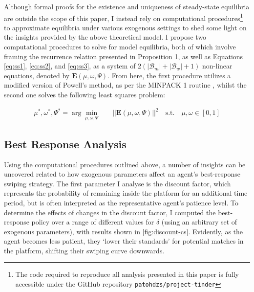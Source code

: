 Although formal proofs for the existence and uniqueness of steady-state equilibria are outside the scope of this paper, I instead rely on computational procedures\footnote{The code required to reproduce all analysis presented in this paper is fully accessible under the GitHub repository \texttt{patohdzs/project-tinder}} to approximate equilibria under various exogenous settings to shed some light on the insights provided by the above theoretical model. I propose two computational procedures to solve for model equilibria, both of which involve framing the recurrence relation presented in Proposition 1, as well as Equations \ref{eq:ss1}, \ref{eq:ss2}, and \ref{eq:ss3}, as a system of $2(|\mathcal{B}_m|+|\mathcal{B}_w|+1)$ non-linear equations, denoted by $\mathbf{E}(\mu,\omega,\Psi)$. From here, the first procedure utilizes a modified version of Powell's method, as per the MINPACK 1 routine \citep{more1980user}, whilst the second one solves the following least squares problem:

\begin{equation*}
    \begin{split} 
        \mu^*, \omega^*, \Psi^* = \arg\min_{\mu,\omega,\Psi} \quad &  ||\mathbf{E}(\mu,\omega,\Psi)||^2 \quad \textrm{s.t.} \quad  \mu, \omega  \in [0,1] 
    \end{split}
\end{equation*}


\subsection{Best Response Analysis}\label{sec:section3.2} 
Using the computational procedures outlined above, a number of insights can be uncovered related to how exogenous parameters affect an agent's best-response swiping strategy. The first parameter I analyse is the discount factor, which represents the probability of remaining inside the platform for an additional time period, but is often interpreted as the representative agent's patience level. To determine the effects of changes in the discount factor, I computed the best-response policy over a range of different values for $\delta$ (using an arbitrary set of exogenous parameters), with results shown in \autoref{fig:discount-cs}. Evidently, as the agent becomes less patient, they `lower their standards' for potential matches in the platform, shifting their swiping curve downwards. 

